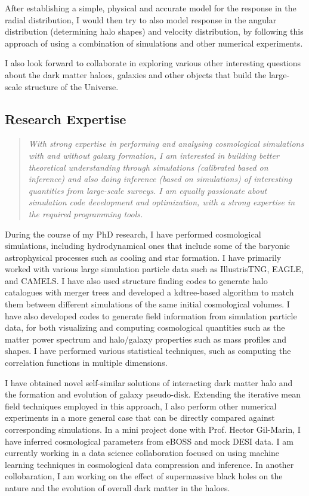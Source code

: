 \documentclass[10pt]{article}
\begin{document}
After establishing a simple, physical and accurate model for the response in the radial distribution, I would then try to also model response in the angular distribution (determining halo shapes) and velocity distribution, by following this approach of using a combination of simulations and other numerical experiments.

I also look forward to collaborate in exploring various other interesting questions about the dark matter haloes, galaxies and other objects that build the large-scale structure of the Universe.

\subsection{Research Expertise}

\begin{quote}
    \textit{With strong expertise in performing and analysing cosmological simulations with and without galaxy formation, I am interested in building better theoretical understanding through simulations (calibrated based on inference) and also doing inference (based on simulations) of interesting quantities from large-scale surveys. I am equally passionate about simulation code development and optimization, with a strong expertise in the required programming tools.}
\end{quote}

During the course of my PhD research, I have performed cosmological simulations, including hydrodynamical ones that include some of the baryonic astrophysical processes such as cooling and star formation. I have primarily worked with various large simulation particle data such as IllustrisTNG, EAGLE, and CAMELS. I have also used structure finding codes to generate halo catalogues with merger trees and developed a kdtree-based algorithm to match them between different simulations of the same initial cosmological volumes. I have also developed codes to generate field information from simulation particle data, for both visualizing and computing cosmological quantities such as the matter power spectrum and halo/galaxy properties such as mass profiles and shapes. I have performed various statistical techniques, such as computing the correlation functions in multiple dimensions. 

I have obtained novel self-similar solutions of interacting dark matter halo and the formation and evolution of galaxy pseudo-disk. Extending the iterative mean field techniques employed in this approach, I also perform other numerical experiments in a more general case that can be directly compared against corresponding simulations. In a mini project done with Prof. Hector Gil-Marin, I have inferred cosmological parameters from eBOSS and mock DESI data. I am currently working in a data science collaboration focused on using machine learning techniques in cosmological data compression and inference. In another collobaration, I am working on the effect of supermassive black holes on the nature and the evolution of overall dark matter in the haloes.
\end{document}
